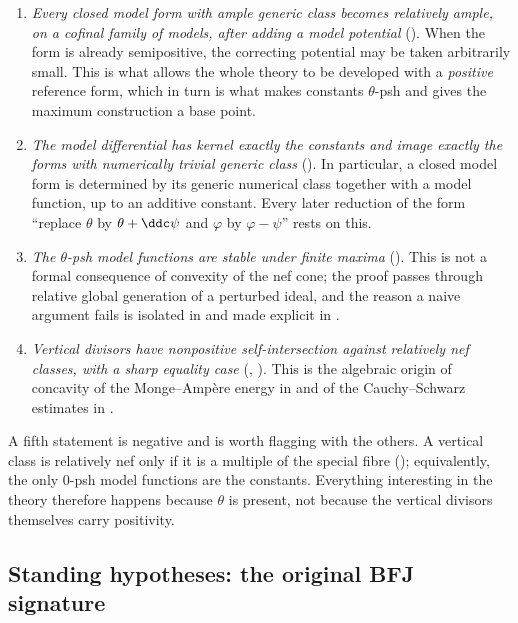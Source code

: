 \begin{enumerate}
\item \emph{Every closed model form with ample generic class becomes
 relatively ample, on a cofinal family of models, after adding a model
 potential} ().  When the form is
 already semipositive, the correcting potential may be taken arbitrarily
 small.  This is what allows the whole theory to be developed with a
 \emph{positive} reference form, which in turn is what makes constants
 \(\theta\)-psh and gives the maximum construction a base point.
\item \emph{The model differential has kernel exactly the constants and
 image exactly the forms with numerically trivial generic class}
 ().  In particular, a closed model form is
 determined by its generic numerical class together with a model function,
 up to an additive constant.  Every later reduction of the form ``replace
 \(\theta\) by \(\theta+\ddc\psi\) and \(\varphi\) by \(\varphi-\psi\)''
 rests on this.
\item \emph{The \(\theta\)-psh model functions are stable under finite
 maxima} ().  This is not a formal consequence of
 convexity of the nef cone; the proof passes through relative global
 generation of a perturbed ideal, and the reason a naive argument fails is
 isolated in  and made explicit in
 .
\item \emph{Vertical divisors have nonpositive self-intersection against
 relatively nef classes, with a sharp equality case}
 (, ).  This is
 the algebraic origin of concavity of the Monge--Amp\`ere energy in
  and of the Cauchy--Schwarz estimates in
 .
\end{enumerate}

A fifth statement is negative and is worth flagging with the others.  A
vertical class is relatively nef only if it is a multiple of the special
fibre (); equivalently, the only
\(0\)-psh model functions are the constants.  Everything interesting in the
theory therefore happens because \(\theta\) is present, not because the
vertical divisors themselves carry positivity.

\subsection{Standing hypotheses: the original BFJ signature}
\label{sec:ch20-hypotheses}

